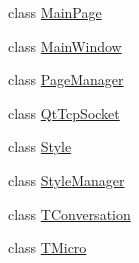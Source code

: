 \begin{DoxyCompactItemize}
\item 
class \mbox{\hyperlink{classbabel_1_1client_1_1_main_page}{Main\+Page}}
\item 
class \mbox{\hyperlink{classbabel_1_1client_1_1_main_window}{Main\+Window}}
\item 
class \mbox{\hyperlink{classbabel_1_1client_1_1_page_manager}{Page\+Manager}}
\item 
class \mbox{\hyperlink{classbabel_1_1client_1_1_qt_tcp_socket}{Qt\+Tcp\+Socket}}
\item 
class \mbox{\hyperlink{classbabel_1_1client_1_1_style}{Style}}
\item 
class \mbox{\hyperlink{classbabel_1_1client_1_1_style_manager}{Style\+Manager}}
\item 
class \mbox{\hyperlink{classbabel_1_1client_1_1_t_conversation}{T\+Conversation}}
\item 
class \mbox{\hyperlink{classbabel_1_1client_1_1_t_micro}{T\+Micro}}
\end{DoxyCompactItemize}
